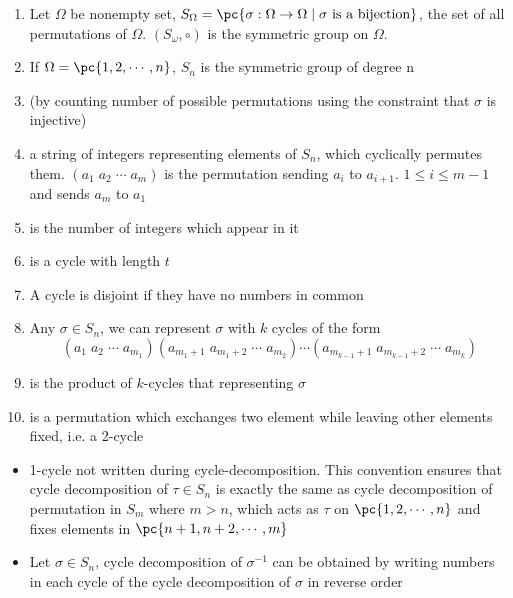 \documentclass[11pt]{article}
\begin{document}
\begin{definition*}
    \begin{enumerate}
        \item {} Let $\Omega$ be nonempty set, $S_{\Omega} = \pc{\sigma: \Omega \to \Omega \mid \sigma \text{ is a bijection}}$, the set of all permutations of $\Omega$. $(S_{\omega}, \circ)$ is the symmetric group on $\Omega$.
        \item {} If $\Omega = \pc{1,2,\cdots,n}$, $S_n$ is the symmetric group of degree n
        \item {} (by counting number of possible permutations using the constraint that $\sigma$ is injective) 
        \item {} a string of integers representing elements of $S_n$, which cyclically permutes them. $(a_1 \; a_2 \; \cdots \; a_m)$ is the permutation sending $a_i$ to $a_{i+1}$. $1\leq i \leq m-1$ and sends $a_m$ to $a_1$
        \item {} is the number of integers which appear in it
        \item {} is a cycle with length $t$
        \item {} A cycle is disjoint if they have no numbers in common
        \item {} Any $\sigma\in S_n$, we can represent $\sigma$ with $k$ cycles of the form 
        \[
            (a_1 \; a_2\; \cdots\; a_{m_1})(a_{m_1+1}\; a_{m_1+2}\;\cdots \; a_{m_2}) \cdots (a_{m_{k-1}+1}\; a_{m_{k-1}+2} \;\cdots \; a_{m_k})
        \]
        \item {} is the product of $k$-cycles that representing $\sigma$
        \item {} is a permutation which exchanges two element while leaving other elements fixed, i.e. a 2-cycle
    \end{enumerate}
    \begin{itemize}
        \item {} 1-cycle not written during cycle-decomposition. This convention ensures that cycle decomposition of $\tau\in S_n$ is exactly the same as cycle decomposition of permutation in $S_{m}$ where $m>n$, which acts as $\tau$ on $\pc{1,2,\cdots,n}$ and fixes elements in $\pc{n+1,n+2,\cdots,m}$
        \item {} Let $\sigma\in S_n$, cycle decomposition of $\sigma^{-1}$ can be obtained by writing numbers in each cycle of the cycle decomposition of $\sigma$ in reverse order

\end{itemize}
\end{definition*}
\end{document}
